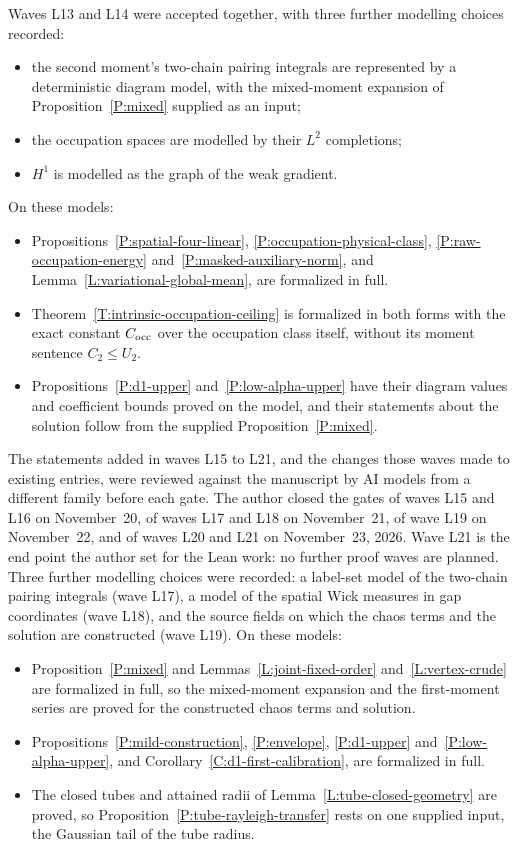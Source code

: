 Waves L13 and L14 were accepted together, with three further modelling choices
recorded:
\begin{itemize}
  \item the second moment's two-chain pairing integrals are represented by a
    deterministic diagram model, with the mixed-moment expansion of
    Proposition~\ref{P:mixed} supplied as an input;
  \item the occupation spaces are modelled by their $L^2$ completions;
  \item $H^1$ is modelled as the graph of the weak gradient.
\end{itemize}
On these models:
\begin{itemize}
  \item Propositions~\ref{P:spatial-four-linear}, \ref{P:occupation-physical-class},
    \ref{P:raw-occupation-energy} and~\ref{P:masked-auxiliary-norm}, and
    Lemma~\ref{L:variational-global-mean}, are formalized in full.
  \item Theorem~\ref{T:intrinsic-occupation-ceiling} is formalized in both forms
    with the exact constant $C_{\rm occ}$ over the occupation class itself,
    without its moment sentence $C_2\le U_2$.
  \item Propositions~\ref{P:d1-upper} and~\ref{P:low-alpha-upper} have their
    diagram values and coefficient bounds proved on the model, and their
    statements about the solution follow from the supplied
    Proposition~\ref{P:mixed}.
\end{itemize}
The statements added in waves L15 to L21, and the changes those waves made to
existing entries, were reviewed against the manuscript by AI models from a different family before
each gate. The author closed the gates of waves L15 and L16 on November~20, of
waves L17 and L18 on November~21, of wave L19 on November~22, and of waves L20
and L21 on November~23, 2026. Wave L21 is the end point the author set for the
Lean work: no further proof waves are planned. Three further modelling choices
were recorded: a label-set model of the two-chain pairing integrals (wave L17), a
model of the spatial Wick measures in gap coordinates (wave L18), and the source
fields on which the chaos terms and the solution are constructed (wave L19). On
these models:
\begin{itemize}
  \item Proposition~\ref{P:mixed} and Lemmas~\ref{L:joint-fixed-order}
    and~\ref{L:vertex-crude} are formalized in full, so the mixed-moment
    expansion and the first-moment series are proved for the constructed chaos terms and solution.
  \item Propositions~\ref{P:mild-construction}, \ref{P:envelope},
    \ref{P:d1-upper} and~\ref{P:low-alpha-upper}, and
    Corollary~\ref{C:d1-first-calibration}, are formalized in full.
  \item The closed tubes and attained radii of
    Lemma~\ref{L:tube-closed-geometry} are proved, so
    Proposition~\ref{P:tube-rayleigh-transfer} rests on one supplied input, the
    Gaussian tail of the tube radius.
\end{itemize}
